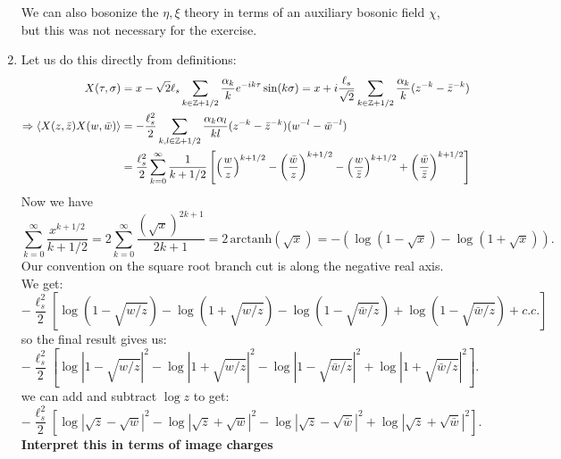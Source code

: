 \documentclass[11pt]{article}
\begin{document}
\begin{enumerate}
	We can also bosonize the $\eta, \xi$ theory in terms of an auxiliary bosonic field $\chi$, but this was not necessary for the exercise. 
	
	\item Let us do this directly from definitions:
	\[
	\begin{aligned}
		X(\tau, \sigma) &= x - \sqrt{2} \ell_s \sum_{k \in \mathbb Z + 1/2} \frac{\alpha_k}{k} e^{-i k \tau} \sin(k \sigma) = x + i \frac{\ell_s}{\sqrt 2} \sum_{k \in \mathbb Z + 1/2} \frac{\alpha_k}{k} (z^{-k} - \bar z^{-k})\\
		\Rightarrow \braket{X(z, \bar z) X(w, \bar w)} &= -\frac{\ell_s^2}{2} \sum_{k, l \in \mathbb Z + 1/2} \frac{\alpha_{k} \alpha_l}{k l} (z^{-k} - \bar z^{-k}) (w^{-l} - \bar w^{-l})\\
		&= \frac{\ell_s^2}{2} \sum_{k = 0}^\infty \frac{1}{k+1/2} \left[ \left(\frac{w}{z} \right)^{k+1/2} - \left(\frac{\bar w}{z} \right)^{k+1/2} - \left(\frac{w}{\bar z} \right)^{k+1/2} + \left(\frac{\bar w}{\bar z} \right)^{k+1/2} \right]
	\end{aligned}
	\]
	Now we have \[
		\sum_{k=0}^\infty \frac{x^{k+1/2}}{k+1/2} = 2 \sum_{k=0}^\infty \frac{(\sqrt x)^{2k+1}}{2k+1} = 2\, \mathrm{arctanh}(\sqrt{x}) = - ( \log(1-\sqrt x) - \log(1+\sqrt x)).
	\]
	Our convention on the square root branch cut is along the negative real axis. We get:
	\[
		-\frac{\ell_s^2}{2} \left[\log(1 - \sqrt{w/z}) - \log(1 + \sqrt{w/z})  - \log(1 - \sqrt{\bar w/z}) + \log(1 - \sqrt{\bar w/z}) + c.c. \right]
	\]
	so the final result gives us:
	\[
		- \frac{\ell_s^2}{2} \left[ \log|1 - \sqrt{w/z}|^2 - \log|1 + \sqrt{w/z}|^2 - \log|1 - \sqrt{\bar w/z}|^2 +  \log|1 + \sqrt{\bar w/z}|^2 \right].
	\]
	we can add and subtract $\log z$ to get:
	\[
		- \frac{\ell_s^2}{2} \left[ \log|\sqrt{z} - \sqrt{w}|^2 - \log|\sqrt{z} + \sqrt{w}|^2 - \log|\sqrt{z} - \sqrt{\bar w}|^2 + \log|\sqrt{z} + \sqrt{\bar w}|^2 \right].
	\]
	\textbf{Interpret this in terms of image charges}
	

\end{enumerate}
\end{document}
